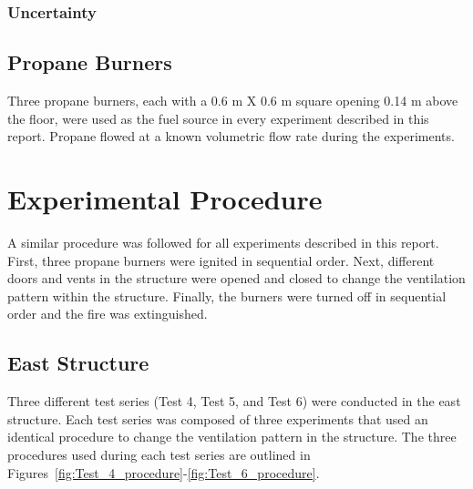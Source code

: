 \documentclass[12pt,oneside]{book}
\begin{document}
\subsection{Uncertainty}
\label{sec:Uncertainty}

\section{Propane Burners}
\label{sec:Burners}
Three propane burners, each with a 0.6 m X 0.6 m square opening 0.14 m above the floor, were used as the fuel source in every experiment described in this report. Propane flowed at a known volumetric flow rate during the experiments.

\chapter{Experimental Procedure}
\label{chap:Experimental_Procedure}
A similar procedure was followed for all experiments described in this report. First, three propane burners were ignited in sequential order. Next, different doors and vents in the structure were opened and closed to change the ventilation pattern within the structure. Finally, the burners were turned off in sequential order and the fire was extinguished. 

\section{East Structure}
\label{sec:East_exps}
Three different test series (Test 4, Test 5, and Test 6) were conducted in the east structure. Each test series was composed of three experiments that used an identical procedure to change the ventilation pattern in the structure. The three procedures used during each test series are outlined in Figures~\ref{fig:Test_4_procedure}-\ref{fig:Test_6_procedure}.

\end{document}

